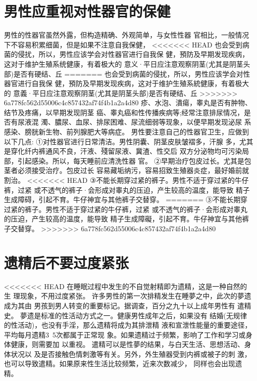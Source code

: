 \documentclass[12pt,UTF8]{ctexbook}
\begin{document}
\section{男性应重视对性器官的保健}

男性的性器官虽然外露，但构造精确、外观简单，与女性性器
官相比，一般情况下不容易积累细菌，但是如果不注意自我保健，
<<<<<<< HEAD
也会受到病菌的侵扰，所以，男性应该学会对性器官进行自我保
健，預防及早期发现疾病，这对于维护生殖系统健康，有着极大的
意义·平日应注意观察阴茎(尤其是阴茎头部)是否有硬结、丘
=======
也会受到病菌的侵扰，所以，男性应该学会对性器官进行自我保
健，預防及早期发现疾病，这对于维护生殖系統健康，有着极大的
意義·平日应注意观察阴茎(尤其是阴茎头部)是否有硬结、丘
>>>>>>> 6a778fc562d55006c4c857432af74f4b1a2a4d80
疹、水泡、潰瘍，睾丸是否有肿物、结节及疼痛，以早期发现阴茎
癌、睾丸癌和性传播疾病等;经常注意排尿情况，是否有尿液混
濁、膿尿、血尿、排尿困难、尿流细弱等现象，以便早期发现泌尿
系感染、膀胱新生物、前列腺肥大等病症。
男性要注意自己的性器官卫生，应做到以下几点:
①对性器官进行日常清洁。男性阴囊、阴茎皮肤皱褶多，汗腺
多，尤其是穿化纤内裤通风不良，汗液、殘留尿液、冀渣、性交后
双方分泌物均可污染局部，引起感染。所以，每天睡前应清洗性器
官。
②早期治疗包皮过长。尤其是包茎者必须接受治疗。包皮过长
容易藏垢纳污，容易招致生殖器炎症，最好婚前就割治。
<<<<<<< HEAD
③不能长期穿过紧的裤子。男性不适于穿过紧的牛仔裤，过紧
或不透气的裤子·会形成对睾丸的压迫，产生较高的温度，能导致
精子生成障碍，引起不育。牛仔神宜与其他裤子交替穿。
=======
③不能长期穿过紧的裤子。男性不适于穿过紧的牛仔裤，过紧
或不透气的裤子·会形成对睾丸的压迫，产生较高的温度，能导致
精子生成障礙，引起不育。牛仔神宜与其他裤子交替穿。
>>>>>>> 6a778fc562d55006c4c857432af74f4b1a2a4d80

\section{遗精后不要过度紧张}

<<<<<<< HEAD
在睡眠过程中发生的不自觉射精即为遗精，这是一种自然的生
理现象，不用过度紧张。
许多男性的第一次排精发生在睡夢之中，此次的夢遗成为其由
男孩到男人转变的重要标记。据调查，百分之九十以上成年男性有
遣精史。
夢遗是标准的性活动方式之一。健康男性成年之后，如果没有
结婚(无规律的性活动)，也没有手淫，那么遗精将成为其排泄精
液和宣泄性能量的重要途径，平均每月遗精3~5次都属于正常现
象。如果遗精过于频繁，影响了工作和学习或身体健康，则需要加
以重视。
遣精可以是性夢的结果，与白天生活、思想活动、身体状况以
及是否接触色情刺激等有关。另外，外生殖器受到内裤或被子的刺
激，也可以导致遣精。如果原来性生活比较频繁，近来次数减少，
同样也会出现遗精。
\end{document}
